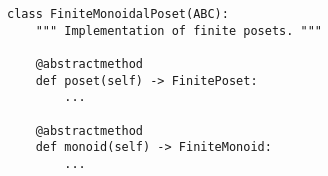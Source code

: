 \par\begin{minipage}{60ex}
\begin{verbatim}
class FiniteMonoidalPoset(ABC):
    """ Implementation of finite posets. """

    @abstractmethod
    def poset(self) -> FinitePoset:
        ...

    @abstractmethod
    def monoid(self) -> FiniteMonoid:
        ...
\end{verbatim}
\end{minipage}\par